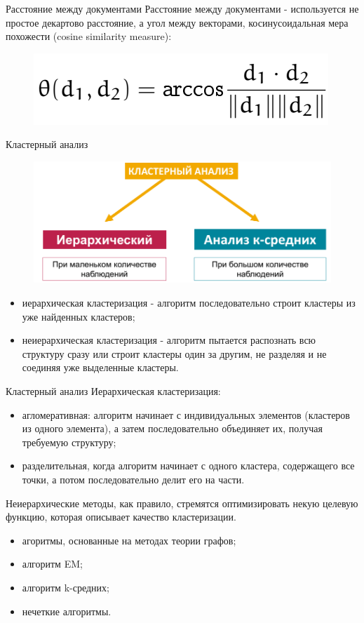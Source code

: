 \documentclass{beamer}
\begin{document}
\begin{frame}{Расстояние между документами}
Расстояние между документами - используется не простое декартово расстояние, а угол между векторами, косинусоидальная мера похожести (cosine similarity measure):
\begin{figure}[h]
\centering
\includegraphics[scale=0.4]{images/lec07-pic14.png}
\end{figure}
\end{frame}

\begin{frame}{Кластерный анализ}
\begin{figure}[h]
\centering
\includegraphics[scale=0.5]{images/lec07-pic15.png}
\end{figure}
\begin{itemize}
\item иерархическая кластеризация - алгоритм последовательно строит кластеры из уже найденных кластеров;
\item неиерархическая кластеризация - алгоритм пытается распознать всю структуру сразу или строит кластеры один за другим, не разделяя и не соединяя уже выделенные кластеры.
\end{itemize}
\end{frame}

\begin{frame}{Кластерный анализ}
Иерархическая кластеризация:
\begin{itemize}
\item агломеративная: алгоритм начинает с индивидуальных элементов (кластеров из одного элемента), а затем последовательно объединяет их, получая требуемую структуру; 
\item разделительная, когда алгоритм начинает с одного кластера, содержащего все точки, а потом последовательно делит его на части.
\end{itemize}
Неиерархические методы, как правило, стремятся оптимизировать некую целевую функцию, которая описывает качество кластеризации. 
\begin{itemize}
\item агоритмы, основанные на методах теории графов;
\item алгоритм EM;
\item алгоритм k-средних;
\item нечеткие алгоритмы.
\end{itemize}
\end{frame}
\end{document}
